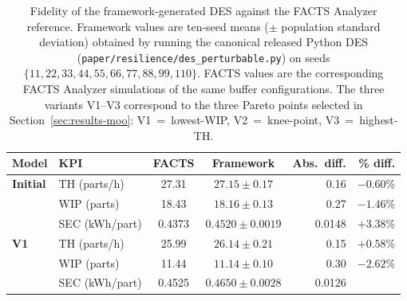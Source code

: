 \documentclass[a4paper,fleqn]{cas-sc}
\begin{document}
\begin{table}[ ]                                                               
  \centering                             
  \caption{Fidelity of the framework-generated DES against the FACTS Analyzer       
  reference. Framework values are ten-seed means ($\pm$ population standard         
  deviation) obtained by running the canonical released Python DES                  
  (\texttt{paper/resilience/des\_perturbable.py}) on seeds                          
  $\{11, 22, 33, 44, 55, 66, 77, 88, 99, 110\}$. FACTS values are the               
  corresponding FACTS Analyzer simulations of the same buffer configurations.       
  The three variants V1--V3 correspond to the three Pareto points selected in       
  Section~\ref{sec:results-moo}: V1~=~lowest-WIP, V2~=~knee-point,                  
  V3~=~highest-TH.}                        
  \label{tab:facts_python_comparison}                                               
  \begin{tabular}{@{}l l c c r r@{}}                                                
  \toprule                                                                          
  \textbf{Model} & \textbf{KPI} & \textbf{FACTS} & \textbf{Framework} &             
  \textbf{Abs.\ diff.} & \textbf{\% diff.} \\                                       
  \midrule                                                  
  \textbf{Initial} & TH (parts/h)   & 27.31  & $27.15 \pm 0.17$    & 0.16   &       
  $-0.60$\% \\                                                                      
                   & WIP (parts)    & 18.43  & $18.16 \pm 0.13$    & 0.27   &
  $-1.46$\% \\                                                                      
                   & SEC (kWh/part) & 0.4373 & $0.4520 \pm 0.0019$ & 0.0148 &
  $+3.38$\% \\                                                                      
  \midrule                                                  
  \textbf{V1}      & TH (parts/h)   & 25.99  & $26.14 \pm 0.21$    & 0.15   &       
  $+0.58$\% \\                                                                      
                   & WIP (parts)    & 11.44  & $11.14 \pm 0.10$    & 0.30   &
  $-2.62$\% \\                                                                      
                   & SEC (kWh/part) & 0.4525 & $0.4650 \pm 0.0028$ & 0.0126 &

\end{tabular}
\end{table}
\end{document}
